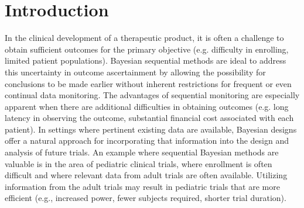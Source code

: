 \documentclass[useAMS,usenatbib,referee]{biom}
\begin{document}

%

\section{Introduction}
In the clinical development of a therapeutic product, it is often a challenge to obtain sufficient outcomes for the primary objective (e.g. difficulty in enrolling, limited patient populations). Bayesian sequential methods are ideal to address this uncertainty in outcome ascertainment by allowing the possibility for conclusions to be made earlier without inherent restrictions for frequent or even continual data monitoring. The advantages of sequential monitoring are especially apparent when there are additional difficulties in obtaining outcomes (e.g. long latency in observing the outcome, substantial financial cost associated with each patient). In settings where pertinent existing data are available, Bayesian designs offer a natural approach for incorporating that information into the design and analysis of future trials. An example where sequential Bayesian methods are valuable is in the area of pediatric clinical trials, where enrollment is often difficult and where relevant data from adult trials are often available. Utilizing information from the adult trials may result in pediatric trials that are more efficient (e.g., increased power, fewer subjects required, shorter trial duration).
\end{document}
